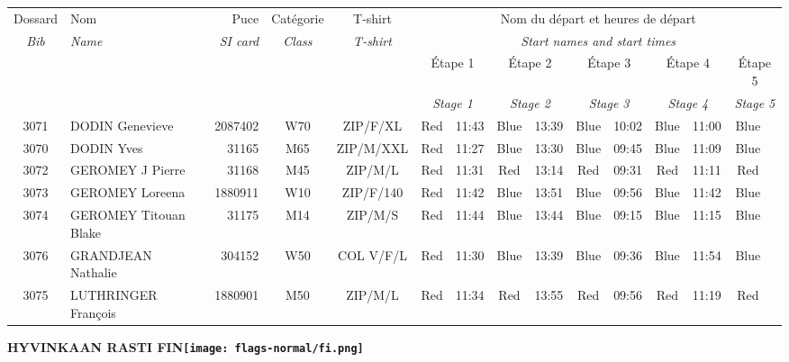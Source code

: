 \documentclass{report}
\begin{document}
  \begin{longtable}{|c|l|r|c|c|*{5}{cc|}}
    Dossard & Nom  & Puce    & Catégorie & T-shirt & \multicolumn{10}{c|}{Nom du départ et heures de départ} \\
    \itshape Bib     & \itshape Name & \itshape SI card & \itshape Class  & \itshape  T-shirt  & \multicolumn{10}{c|}{\itshape Start names and start times} \\
    \hline
    & & & & & \multicolumn{2}{c|}{Étape 1} & \multicolumn{2}{c|}{Étape 2} & \multicolumn{2}{c|}{Étape 3} & \multicolumn{2}{c|}{Étape 4} & \multicolumn{2}{c|}{Étape 5} \\
    & & & & & \multicolumn{2}{c|}{\itshape Stage 1} & \multicolumn{2}{c|}{\itshape Stage 2} & \multicolumn{2}{c|}{\itshape Stage 3} & \multicolumn{2}{c|}{\itshape Stage 4} & \multicolumn{2}{c|}{\itshape Stage 5} \\
    \hline
    3071 & DODIN Genevieve & 2087402 & W70 & ZIP/F/XL & Red & 11:43 & Blue & 13:39 & Blue & 10:02 & Blue & 11:00 & Blue &  \\
    3070 & DODIN Yves & 31165 & M65 & ZIP/M/XXL & Red & 11:27 & Blue & 13:30 & Blue & 09:45 & Blue & 11:09 & Blue &  \\
    3072 & GEROMEY J Pierre & 31168 & M45 & ZIP/M/L & Red & 11:31 & Red & 13:14 & Red & 09:31 & Red & 11:11 & Red &  \\
    3073 & GEROMEY Loreena & 1880911 & W10 & ZIP/F/140 & Red & 11:42 & Blue & 13:51 & Blue & 09:56 & Blue & 11:42 & Blue &  \\
    3074 & GEROMEY Titouan Blake & 31175 & M14 & ZIP/M/S & Red & 11:44 & Blue & 13:44 & Blue & 09:15 & Blue & 11:15 & Blue &  \\
    3076 & GRANDJEAN Nathalie & 304152 & W50 & COL V/F/L & Red & 11:30 & Blue & 13:39 & Blue & 09:36 & Blue & 11:54 & Blue &  \\
    3075 & LUTHRINGER François & 1880901 & M50 & ZIP/M/L & Red & 11:34 & Red & 13:55 & Red & 09:56 & Red & 11:19 & Red &  \\
  \end{longtable}
\newpage
  \Huge \centering \bfseries HYVINKAAN RASTI  FIN\normalfont \footnotesize \sffamily \hfill \texttt{[image: flags-normal/fi.png]} \newline 
\end{document}

